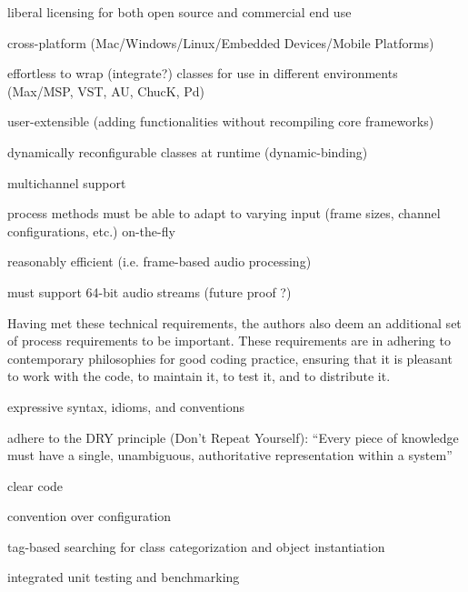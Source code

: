 \documentclass[twoside,10pt]{article}
\newenvironment{packed_item}{
\begin{itemize}
  \setlength{\itemsep}{1pt}
  \setlength{\parskip}{0pt}
  \setlength{\parsep}{0pt}
}{\end{itemize}}
\begin{document}
\begin{packed_item}%
	\item liberal licensing for both open source and commercial end use
	\item cross-platform (Mac/Windows/Linux/Embedded Devices/Mobile Platforms)	
	\item effortless to wrap (integrate?) classes for use in different environments (Max/MSP, VST, AU, ChucK, Pd)
	\item user-extensible (adding functionalities without recompiling core frameworks)
	\item dynamically reconfigurable classes at runtime (dynamic-binding)
	\item multichannel support
	\item process methods must be able to adapt to varying input (frame sizes, channel configurations, etc.) on-the-fly
	\item reasonably efficient (i.e. frame-based audio processing)
	\item must support 64-bit audio streams (future proof ?)



\end{packed_item}%

Having met these technical requirements, the authors also deem an additional set of process requirements to be important.  These requirements are in adhering to contemporary philosophies for good coding practice, ensuring that it is pleasant to work with the code, to maintain it, to test it, and to distribute it.


\begin{packed_item}%
	\item expressive syntax, idioms, and conventions
	\item adhere to the DRY principle (Don't Repeat Yourself): ``Every piece of knowledge must have a single, unambiguous, authoritative representation within a system''\cite{Hunt:1999}
	\item clear code %
	\item convention over configuration
	\item tag-based searching for class categorization and object instantiation
	\item integrated unit testing and benchmarking %
\end{packed_item}%
\end{document}
